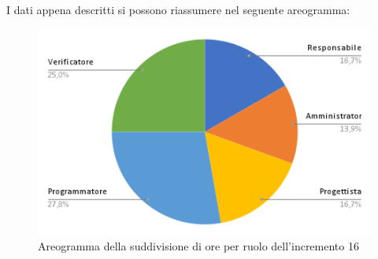 \pagebreak
I dati appena descritti si possono riassumere nel seguente areogramma:
\begin{figure}[!h]
    \vspace{5px}
    \includegraphics[scale=0.5]{../../../Images/Diagrammi/Diagramma a torta/areogrammaIncremento16.png}
    \centering
    \caption{Areogramma della suddivisione di ore per ruolo dell'incremento 16}
\end{figure}

